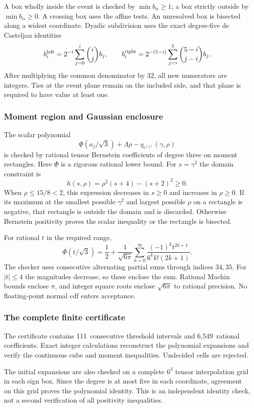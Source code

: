 \documentclass[11pt,a4paper]{article}
\numberwithin{equation}{section}
\theoremstyle{definition}
\theoremstyle{remark}
\newcommand{\CertificateCells}{111}
\newcommand{\CertificateCoefficients}{6,549}
\begin{document}
A box wholly inside the event is checked by $\min b_\alpha\ge1$; a box
strictly outside by $\min b_\alpha\ge0$. A crossing box uses the affine
tests. An unresolved box is bisected along a widest coordinate. Dyadic
subdivision uses the exact degree-five de Casteljau identities
\[
 b_i^{\rm left}=2^{-i}\sum_{j=0}^i\binom ij b_j,
 \qquad
 b_i^{\rm right}=2^{-(5-i)}\sum_{j=i}^5\binom{5-i}{j-i}b_j.
\]
After multiplying the common denominator by $32$, all new numerators are
integers. Ties at the event plane remain on the included side, and that
plane is required to have value at least one.

\subsubsection{Moment region and Gaussian enclosure}
The scalar polynomial
\[
 \underline\Phi(a_j/\sqrt3)+\Lambda\rho-q_{c^{(j)}}(\gamma,\rho)
\]
is checked by rational tensor Bernstein coefficients of degree three on
moment rectangles. Here $\underline\Phi$ is a rigorous rational lower bound.
For $s=\gamma^2$ the domain constraint is
\[
 h(s,\rho)=\rho^2(s+4)-(s+2)^2\ge0.
\]
When $\rho\le15/8<2$, this expression decreases in $s\ge0$ and increases
in $\rho\ge0$. If its maximum at the smallest possible $\gamma^2$ and
largest possible $\rho$ on a rectangle is negative, that rectangle is
outside the domain and is discarded. Otherwise Bernstein positivity proves
the scalar inequality or the rectangle is bisected.

For rational $t$ in the required range,
\[
 \Phi(t/\sqrt3)=\frac12+\frac1{\sqrt{6\pi}}
 \sum_{k=0}^{\infty}\frac{(-1)^k t^{2k+1}}{6^k k!(2k+1)}.
\]
The checker uses consecutive alternating partial sums through indices
$34,35$. For $|t|\le4$ the magnitudes decrease, so these enclose the sum.
Rational Machin bounds enclose $\pi$, and integer square roots enclose
$\sqrt{6\pi}$ to rational precision. No floating-point normal cdf enters
acceptance.

\subsubsection{The complete finite certificate}
The certificate contains \CertificateCells\ consecutive threshold
intervals and \CertificateCoefficients\ rational coefficients.
Exact integer calculations reconstruct the polynomial expansions and
verify the continuous cube and moment inequalities. Undecided cells
are rejected.

The initial expansions are also checked on a complete \(6^3\)
tensor interpolation grid in each sign box. Since the degree is at
most five in each coordinate, agreement on this grid proves the
polynomial identity. This is an independent identity check, not a
second verification of all positivity inequalities.
\end{document}
